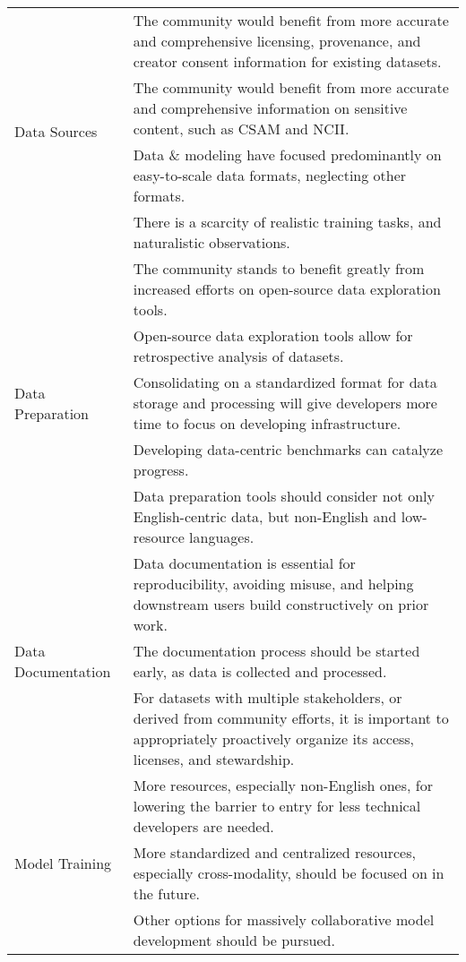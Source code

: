 \begin{table*}[t!]
\begin{adjustbox}{width=\textwidth}
\begin{tabular}{m{3cm} m{13cm}}
\multirow{4}{*}{Data Sources} & The community would benefit from more accurate and comprehensive licensing, provenance, and creator consent information for existing datasets. \\
& \cellcolor[gray]{0.9}The community would benefit from more accurate and comprehensive information on sensitive content, such as CSAM and NCII. \\
& Data \& modeling have focused predominantly on easy-to-scale data formats, neglecting other formats. \\
& \cellcolor[gray]{0.9}There is a scarcity of realistic training tasks, and naturalistic observations. \\
\midrule
\multirow{5}{*}{Data Preparation} &The community stands to benefit greatly from increased efforts on open-source data exploration tools. \\
& \cellcolor[gray]{0.9} Open-source data exploration tools allow for retrospective analysis of datasets. \\
& Consolidating on a standardized format for data storage and processing will give developers more time to focus on developing infrastructure. \\
& \cellcolor[gray]{0.9} Developing data-centric benchmarks can catalyze progress. \\
& Data preparation tools should consider not only English-centric data, but non-English and low-resource languages. \\
\midrule
\multirow{3}{*}{Data Documentation} & Data documentation is essential for reproducibility, avoiding misuse, and helping downstream users build constructively on prior work. \\
& \cellcolor[gray]{0.9} The documentation process should be started early, as data is collected and processed. \\
& For datasets with multiple stakeholders, or derived from community efforts, it is important to appropriately proactively organize its access, licenses, and stewardship. \\
\midrule
\multirow{4}{*}{Model Training} & More resources, especially non-English ones, for lowering the barrier to entry for less technical developers are needed. \\
& \cellcolor[gray]{0.9} More standardized and centralized resources, especially cross-modality, should be focused on in the future. \\
& Other options for massively collaborative model development should be pursued. \\

\end{tabular}
\end{adjustbox}
\end{table*}
